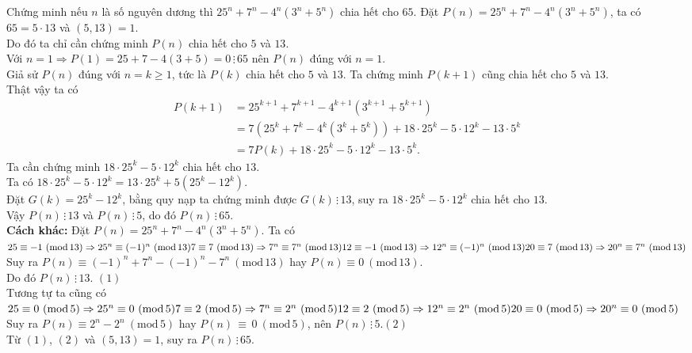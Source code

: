 \begin{ex}%
	Chứng minh nếu $n$ là số nguyên dương thì $25^n + 7^n - 4^n\left(3^n + 5^n\right)$ chia hết cho $65$.
	\loigiai
	{
	Đặt $P(n)=25^n + 7^n - 4^n\left(3^n + 5^n\right)$, ta có $65=5\cdot 13$ và  $(5,13)=1$.\\
	Do đó ta chỉ cần chứng minh $P(n)$ chia hết cho $5$ và $13$.\\
	Với $n=1\Rightarrow P(1)=25+7-4(3+5)=0 \, \vdots \, 65$ nên $P(n)$ đúng với $n=1$.\\
	Giả sử $P(n)$ đúng với $n=k\ge 1$, tức là $P(k)$ chia hết cho $5$ và $13$. Ta chứng minh $P(k+1)$ cũng chia hết cho $5$ và $13$.\\
	Thật vậy ta có
	\begin{align*}
	P(k+1)&=25^{k+1}+7^{k+1}-4^{k+1}(3^{k+1}+5^{k+1})\\
	&=7(25^k+7^k-4^k(3^k+5^k))+18\cdot 25^k-5\cdot 12^k-13\cdot 5^k\\
	&=7P(k)+18\cdot 25^k-5\cdot 12^k-13\cdot 5^k.
	\end{align*}
	Ta cần chứng minh $18\cdot 25^k-5\cdot 12^k$ chia hết cho $13$.\\
	Ta có $18\cdot 25^k-5\cdot 12^k=13\cdot 25^k+5(25^k-12^k)$.\\
	Đặt $G(k)=25^k-12^k$, bằng quy nạp ta chứng minh được $G(k) \, \vdots \, 13$, suy ra $18\cdot 25^k-5\cdot 12^k$ chia hết cho $13$.\\
	Vậy $P(n) \, \vdots \, 13$ và $P(n) \, \vdots \, 5$, do đó $P(n) \, \vdots \, 65$. \\
	\textbf{Cách khác:} Đặt $P(n)=25^n + 7^n - 4^n\left(3^n + 5^n\right)$. Ta có\\
	$25\equiv -1~(\mathrm{mod \,} 13) \Rightarrow 25^n\equiv (-1)^n~(\mathrm{mod \,} 13)\\
	7\equiv 7~(\mathrm{mod \,} 13)\Rightarrow 7^n\equiv 7^n~(\mathrm{mod \,} 13)\\
	12\equiv -1~(\mathrm{mod \,} 13)\Rightarrow 12^n\equiv (-1)^n~(\mathrm{mod \,} 13)\\
	20\equiv 7~(\mathrm{mod \,} 13)\Rightarrow 20^n\equiv 7^n~(\mathrm{mod \,} 13)$\\
	Suy ra $P(n)\equiv (-1)^n+7^n-(-1)^n-7^n~(\mathrm{mod \,} 13)$ hay $P(n)\equiv 0~(\mathrm{mod \,} 13)$.\\
	Do đó $P(n) \, \vdots \, 13$. \hfill $(1)$\\
	Tương tự ta cũng có\\
	$25\equiv 0~(\mathrm{mod \,} 5)\Rightarrow 25^n\equiv 0~(\mathrm{mod \,} 5)\\
	7\equiv 2~(\mathrm{mod \,} 5)\Rightarrow 7^n\equiv 2^n~(\mathrm{mod \,} 5)\\
	12\equiv 2~(\mathrm{mod \,} 5)\Rightarrow 12^n\equiv 2^n~(\mathrm{mod \,} 5)\\
	20\equiv 0~(\mathrm{mod \,} 5)\Rightarrow 20^n\equiv 0~(\mathrm{mod \,} 5)$\\
	Suy ra $P(n)\equiv 2^n-2^n~(\mathrm{mod \,} 5)$ hay $P(n) \, \equiv \, 0~(\mathrm{mod \,} 5)$, nên $P(n) \, \vdots \, 5$.\hfill $(2)$\\
	Từ $(1)$, $(2)$ và $(5,13)=1$, suy ra $P(n) \, \vdots \, 65$.
	}
\end{ex}

